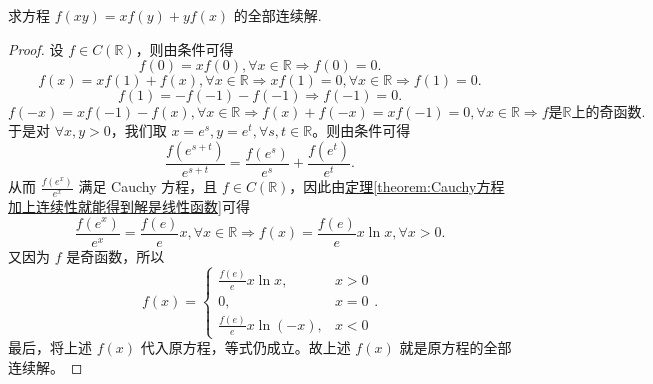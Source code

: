 \documentclass[../../main.tex]{subfiles}%
\begin{document}
\begin{example}
求方程 \(f(xy)=xf(y)+yf(x)\) 的全部连续解.
\end{example}
\begin{proof}

设 \(f\in C(\mathbb{R})\)，则由条件可得
\[
f(0)=xf(0),\forall x\in \mathbb{R}\Rightarrow f(0)=0.
\]
\[
f(x)=xf(1)+f(x),\forall x\in \mathbb{R}\Rightarrow xf(1)=0,\forall x\in \mathbb{R}\Rightarrow f(1)=0.
\]
\[
f(1)=-f(-1)-f(-1)\Rightarrow f(-1)=0.
\]
\[
f(-x)=xf(-1)-f(x),\forall x\in \mathbb{R}\Rightarrow f(x)+f(-x)=xf(-1)=0,\forall x\in \mathbb{R}
\Rightarrow f\text{是}\mathbb{R}\text{上的奇函数}.
\]
于是对 \(\forall x,y > 0\)，我们取 \(x = e^s,y = e^t,\forall s,t\in \mathbb{R}\)。则由条件可得
\[
\frac{f(e^{s + t})}{e^{s + t}}=\frac{f(e^s)}{e^s}+\frac{f(e^t)}{e^t}.
\]
从而 \(\frac{f(e^x)}{e^x}\) 满足 Cauchy 方程，且 \(f\in C(\mathbb{R})\)，因此由\hyperref[theorem:Cauchy方程加上连续性就能得到解是线性函数]{定理\ref{theorem:Cauchy方程加上连续性就能得到解是线性函数}}可得
\[
\frac{f(e^x)}{e^x}=\frac{f(e)}{e}x,\forall x\in \mathbb{R}\Rightarrow f(x)=\frac{f(e)}{e}x\ln x,\forall x > 0.
\]
又因为 \(f\) 是奇函数，所以
\[
f(x)=\begin{cases}
\frac{f(e)}{e}x\ln x, & x > 0\\
0, & x = 0\\
\frac{f(e)}{e}x\ln(-x), & x < 0
\end{cases}.
\]
最后，将上述 \(f(x)\) 代入原方程，等式仍成立。故上述 \(f(x)\) 就是原方程的全部连续解。

\end{proof}
\end{document}

